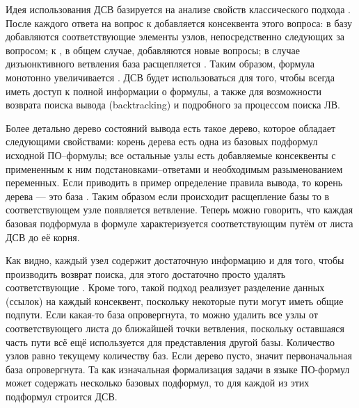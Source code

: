 Идея использования ДСВ базируется на анализе свойств классического подхода . После каждого ответа на вопрос к  добавляется  консеквента этого вопроса: в базу добавляются соответствующие элементы узлов, непосредственно следующих за вопросом; к , в общем случае, добавляются новые вопросы; в случае дизъюнктивного ветвления  база расщепляется .
Таким образом, формула монотонно увеличивается . ДСВ будет использоваться для того, чтобы всегда иметь доступ к полной информации о  формулы, а также для возможности возврата поиска вывода (backtracking) и подробного  за процессом поиска ЛВ.

Более детально дерево состояний вывода есть такое дерево, которое обладает следующими свойствами: корень дерева есть одна из базовых подформул исходной ПО--формулы; все остальные узлы есть добавляемые консеквенты с примененным к ним подстановками--ответами и необходимым разыменованием переменных. Если приводить в пример определение правила вывода, то корень дерева --- это база . Таким образом если происходит расщепление базы то в соответствующем узле появляется ветвление. Теперь можно говорить, что каждая базовая подформула в формуле характеризуется соответствующим путём от листа ДСВ до её корня.

Как видно, каждый узел содержит достаточную информацию и для того, чтобы производить возврат поиска, для этого достаточно просто удалять соответствующие . Кроме того, такой подход реализует разделение данных (ссылок) на каждый консеквент, поскольку некоторые пути могут иметь общие подпути. Если какая-то база опровергнута, то можно удалить все узлы от соответствующего листа до ближайшей точки ветвления, поскольку оставшаяся часть пути всё ещё используется для представления другой базы. Количество  узлов равно текущему количеству баз. Если дерево пусто, значит первоначальная база опровергнута. Та как изначальная формализация задачи в языке ПО-формул может содержать несколько базовых подформул, то для каждой из этих подформул строится  ДСВ.

